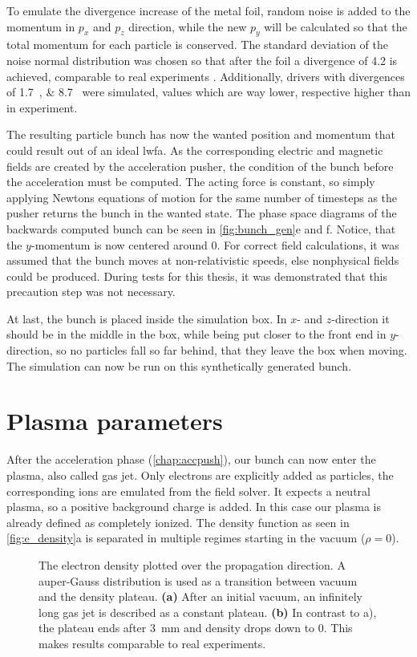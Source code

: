 \documentclass[bachelor_thesis]{subfiles}
\begin{document}
To emulate the divergence increase of the metal foil, random noise is added to the momentum in $p_x$ and $p_z$ direction, while the new $p_y$ will be calculated so that the total momentum for each particle is conserved.
The standard deviation of the noise normal distribution was chosen so that after the foil a divergence of \qty{4.2}{\mrad} is achieved, comparable to real experiments \cite{Schoebel2022}.
Additionally, drivers with divergences of \qtylist{1.7; 8.7}{\mrad} were simulated, values which are way lower, respective higher than in experiment.

The resulting particle bunch has now the wanted position and momentum that could result out of an ideal \gls{lwfa}. As the corresponding electric and magnetic fields are created by the acceleration pusher,
the condition of the bunch before the acceleration must be computed. The acting force is constant, so simply applying Newtons equations of motion for the same number of timesteps as the pusher returns the bunch in the wanted state.
The phase space diagrams of the backwards computed bunch can be seen in \autoref {fig:bunch_gen}e and f. Notice, that the $y$-momentum is now centered around \num{0}. For correct field calculations, it was assumed that the bunch moves at non-relativistic speeds,
else nonphysical fields could be produced. During tests for this thesis, it was demonstrated that this precaution step was not necessary.

At last, the bunch is placed inside the simulation box. In $x$- and $z$-direction it should be in the middle in the box, while being put closer to the front end in $y$-direction, so no particles fall so far behind, that they leave the box when moving.
The simulation can now be run on this synthetically generated bunch.

\section{Plasma parameters}\label{chap:plasma}
After the acceleration phase (\autoref{chap:accpush}), our bunch can now enter the plasma, also called gas jet.
Only electrons are explicitly added as particles, the corresponding ions are emulated from the field solver. It expects a neutral plasma, so a positive background charge is added. 
In this case our plasma is already defined as completely ionized. The density function as seen in \autoref{fig:e_density}a is separated in multiple regimes starting in the vacuum ($\rho=0$). 

\begin{figure}
	\centering
	
	\caption{The electron density plotted over the propagation direction. A auper-Gauss distribution is used as a transition between vacuum and the density plateau.
	\textbf{(a)} After an initial vacuum, an infinitely long gas jet is described as a constant plateau.
	\textbf{(b)} In contrast to a), the plateau ends after \qty{3}{\mm} and density drops down to 0. This makes results comparable to real experiments.}
	\label{fig:e_density}
\end{figure}
\end{document}
